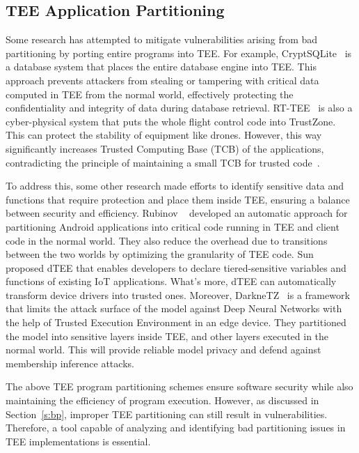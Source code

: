 \subsection{TEE Application Partitioning}
Some research has attempted to mitigate vulnerabilities arising from bad partitioning by porting entire programs into TEE. 
For example, CryptSQLite~\cite{8946540} is a database system that places the entire database engine into TEE. 
This approach prevents attackers from stealing or tampering with critical data computed in TEE from the normal world, effectively protecting the confidentiality and integrity of data during database retrieval.
RT-TEE~\cite{9833604} is also a cyber-physical system that puts the whole flight control code into TrustZone. This can protect the stability of equipment like drones.
However, this way significantly increases Trusted Computing Base (TCB) of the applications, contradicting the principle of maintaining a small TCB for trusted code~\cite{DBLP:conf/ndss/ShindeTTS17, 10.1145/3313808.3313810}.

To address this, some other research made efforts to identify sensitive data and functions that require protection and place them inside TEE, ensuring a balance between security and efficiency.
Rubinov \etal~\cite{10.1145/2884781.2884817} developed an automatic approach for partitioning Android applications into critical code running in TEE and client code in the normal world.
They also reduce the overhead due to transitions between the two worlds by optimizing the granularity of TEE code.
Sun \etal~\cite{10577323} proposed dTEE that enables developers to declare tiered-sensitive variables and functions of existing IoT applications. What's more, dTEE can automatically transform device drivers into trusted ones.
Moreover, DarkneTZ~\cite{10.1145/3386901.3388946} is a framework that limits the attack surface of the model against Deep Neural Networks with the help of Trusted Execution Environment in an edge device.
They partitioned the model into sensitive layers inside TEE, and other layers executed in the normal world. 
This will provide reliable model privacy and defend against membership inference attacks.

The above TEE program partitioning schemes ensure software security while also maintaining the efficiency of program execution.
However, as discussed in Section~\ref{s:bp}, improper TEE partitioning can still result in vulnerabilities. Therefore, a tool capable of analyzing and identifying bad partitioning issues in TEE implementations is essential.
